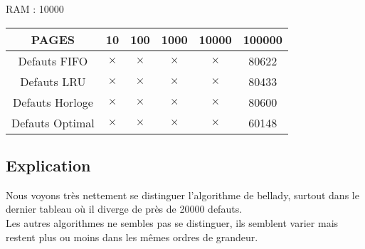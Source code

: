\documentclass[a4paper, 10pt]{article}
\begin{document}
    \newpage
    RAM : 10000 \\
    \begin{tabular}{|c|c|c|c|c|c|}
      \hline
        PAGES             & 10 & 100 & 1000 & 10000 & 100000 \\
      \hline
        Defauts FIFO & $\times$ & $\times$ & $\times$ & $\times$ & 80622 \\
      \hline
        Defauts LRU & $\times$ & $\times$ & $\times$ & $\times$ & 80433 \\
      \hline
        Defauts Horloge & $\times$ & $\times$ & $\times$ & $\times$ & 80600 \\
      \hline
        Defauts Optimal & $\times$ & $\times$ & $\times$ & $\times$ & 60148 \\
      \hline
    \end{tabular}

    \subsection{Explication}
      Nous voyons très nettement se distinguer l'algorithme de bellady,
      surtout dans le dernier tableau où il diverge de près de 20000 defauts. \\

      Les autres algorithmes ne sembles pas se distinguer, ils semblent varier
      mais restent plus ou moins dans les mêmes ordres de grandeur.
\end{document}
